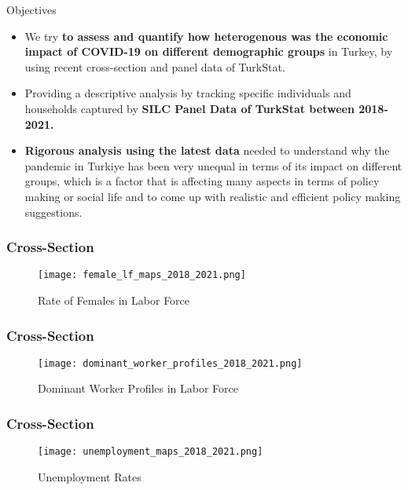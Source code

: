 \documentclass[
	11pt, %
]{beamer}
\begin{document}
\begin{frame}{Objectives}      
   
    \begin{exampleblock}{}
        \begin{itemize}
	        \item \small We try \textbf{to assess and quantify how heterogenous was the economic impact of COVID-19 on different demographic groups}  in Turkey, by using recent cross-section and panel data of TurkStat.

            \item \small Providing a descriptive analysis by tracking specific individuals and households captured by \textbf{SILC Panel Data of TurkStat between 2018-2021.}
            \item \small \textbf{Rigorous analysis using the latest data} needed to understand why the pandemic in Turkiye has been very unequal in terms of its impact on different groups, which is a factor that is affecting many aspects in terms of policy making or social life and to come up with realistic and efficient policy making suggestions.
	    \end{itemize}
    \end{exampleblock}

    \end{frame}

\begin{frame}
    \frametitle{Cross-Section}
    \begin{figure}
        \centering
        \texttt{[image: female\_lf\_maps\_2018\_2021.png]}
        \caption{Rate of Females in Labor Force}
        \label{fig:female_lf}
    \end{figure}
\end{frame}

\begin{frame}
    \frametitle{Cross-Section}
    \begin{figure}
    \centering
    \texttt{[image: dominant\_worker\_profiles\_2018\_2021.png]}
    \caption{Dominant Worker Profiles in Labor Force}
    \label{fig:domworker_lf}
\end{figure}
\end{frame}

\begin{frame}
    \frametitle{Cross-Section}
    
\begin{figure}
    \centering
    \texttt{[image: unemployment\_maps\_2018\_2021.png]}
    \caption{Unemployment Rates}
    \label{fig:unemp_rates}

\end{figure}

\end{frame}
\end{document}
